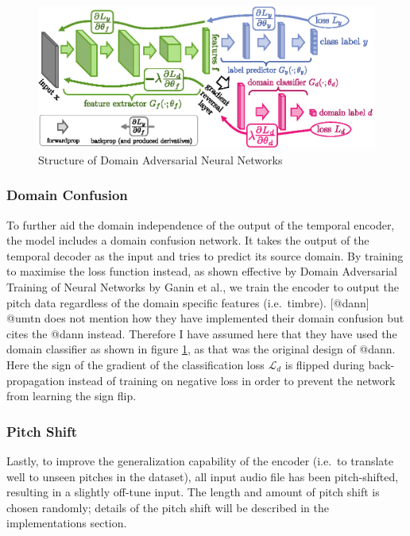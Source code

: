\documentclass[12pt,a4paper,]{report}
\begin{document}
\begin{figure}[h]
    \includegraphics[width=\textwidth]{figures/dann.eps}
    \centering
    \caption{Structure of Domain Adversarial Neural Networks \label{fig:dann}}
\end{figure}

\hypertarget{domain-confusion}{%
\subsubsection{Domain Confusion}\label{domain-confusion}}

To further aid the domain independence of the output of the temporal
encoder, the model includes a domain confusion network. It takes the
output of the temporal decoder as the input and tries to predict its
source domain. By training to maximise the loss function instead, as
shown effective by Domain Adversarial Training of Neural Networks by
Ganin et al., we train the encoder to output the pitch data regardless
of the domain specific features (i.e.~timbre). {[}@dann{]} @umtn does
not mention how they have implemented their domain confusion but cites
the @dann instead. Therefore I have assumed here that they have used the
domain classifier as shown in figure \ref{fig:dann}, as that was the
original design of @dann. Here the sign of the gradient of the
classification loss \(\mathcal{L}_d\) is flipped during back-propagation
instead of training on negative loss in order to prevent the network
from learning the sign flip.

\hypertarget{pitch-shift}{%
\subsubsection{Pitch Shift}\label{pitch-shift}}

Lastly, to improve the generalization capability of the encoder (i.e.~to
translate well to unseen pitches in the dataset), all input audio file
has been pitch-shifted, resulting in a slightly off-tune input. The
length and amount of pitch shift is chosen randomly; details of the
pitch shift will be described in the implementations section.
\end{document}
